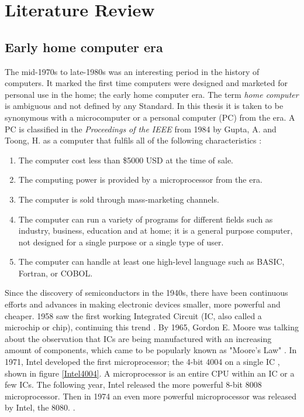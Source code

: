 
\chapter{Literature Review} %
\label{Chapter2} %

\section{Early home computer era} \label{sec: Early home computer era}
 
The mid-1970s to late-1980s was an interesting period in the history of computers. It marked the first time computers were designed and marketed for personal use in the home; the early home computer era. The term \textit{home computer} is ambiguous and not defined by any Standard. In this thesis it is taken to be synonymous with a microcomputer or a personal computer (PC) from the era. A PC is classified in the \textit{Proceedings of the IEEE} from 1984 by Gupta, A. and Toong, H. as a computer that fulfils all of the following characteristics 
\cite{RN24}: 

\begin{enumerate}
\item The computer cost less than \$5000 USD at the time of sale.
\item The computing power is provided by a microprocessor from the era. 
\item The computer is sold through mass-marketing channels. 
\item The computer can run a variety of programs for different fields such as industry, business, education and at home; it is a general purpose computer, not designed for a single purpose or a single type of user.
\item The computer can handle at least one high-level language such as BASIC, Fortran, or COBOL.
\end{enumerate}

Since the discovery of semiconductors in the 1940s, there have been continuous efforts and advances in making electronic devices smaller, more powerful and cheaper. 1958 saw the first working Integrated Circuit (IC, also called a microchip or chip), continuing this trend 
\cite{RN36}. By 1965, Gordon E. Moore was talking about the observation that ICs are being manufactured with an increasing amount of components, which came to be popularly known as "Moore's Law" 
\cite{RN33}. In 1971, Intel developed the first microprocessor; the 4-bit 4004 on a single IC 
\cite{RN37}, shown in figure \ref{Intel4004}. A microprocessor is an entire CPU within an IC or a few ICs. The following year, Intel released the more powerful 8-bit 8008 microprocessor. Then in 1974 an even more powerful microprocessor was released by Intel, the 8080. 
\cite{RN38}. 

